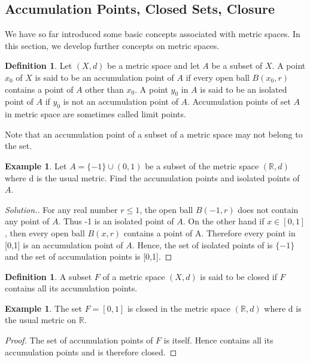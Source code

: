 \documentclass[11pt,a4paper]{article}
\theoremstyle{definition}
\newtheorem{defn}[thm]{Definition}
\newtheorem{exa}[thm]{Example}
\newenvironment{solution}
  {\renewcommand{\qedsymbol}{}\begin{proof}[\textit{Solution}.]}
  {\end{proof}}
\begin{document}
\subsection{Accumulation Points, Closed Sets, Closure}
We have so far introduced some basic concepts associated with metric spaces. In this section, we develop further concepts on metric spaces.

\begin{defn}
Let $(X,d)$ be a metric space and let $A$ be a subset of $X$. A point $x_0$ of $X$ is said to be an accumulation point of $A$ if every open ball $B(x_0,r)$ contains a point of $A$ other than $x_0$. A point $y_0$ in $A$ is said to be an isolated point of $A$ if $y_0$ is not an accumulation point of $A$. Accumulation points of set $A$ in metric space are sometimes called limit points.
\end{defn}

Note that an accumulation point of a subset of a metric space may not belong to the set.

\begin{exa}
Let $A=\{-1\}\cup (0,1)$ be a subset of the metric space $(\mathbb{R},d)$ where d is the usual metric.  Find the accumulation points and isolated points of $A$.
\end{exa}



\begin{solution}
For any real number $r\leq 1$, the open ball $B(-1,r)$ does not contain any point of $A$. Thus -1 is an isolated point of $A$. On the other hand if $x\in [0,1]$, then every open ball $B(x,r)$ contains a point of A. Therefore every point in [0,1] is an accumulation point of $A$. Hence, the set of isolated points of is $\{-1\}$ and the set of accumulation points is [0,1].
\end{solution}

\begin{defn}
A subset $F$ of a metric space $(X,d)$ is said to be closed if $F$ contains all its accumulation points.
\end{defn}


\begin{exa}
The set $F=[0,1]$ is closed in the metric space $(\mathbb{R},d)$ where d is the usual metric on $\mathbb{R}$.
\end{exa}

\begin{proof}
The set of accumulation points of $F$ is itself. Hence contains all its accumulation points and is therefore closed.
\end{proof}
\end{document}

